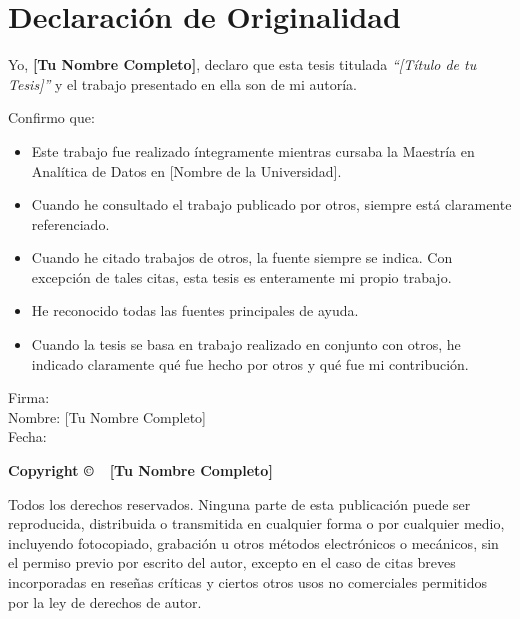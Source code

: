 
\chapter*{Declaración de Originalidad}
\thispagestyle{empty}

\vspace{2cm}

Yo, \textbf{[Tu Nombre Completo]}, declaro que esta tesis titulada \textit{``[Título de tu Tesis]''} y el trabajo presentado en ella son de mi autoría.

\vspace{1cm}

Confirmo que:

\begin{itemize}
    \item Este trabajo fue realizado íntegramente mientras cursaba la Maestría en Analítica de Datos en [Nombre de la Universidad].
    
    \item Cuando he consultado el trabajo publicado por otros, siempre está claramente referenciado.
    
    \item Cuando he citado trabajos de otros, la fuente siempre se indica. Con excepción de tales citas, esta tesis es enteramente mi propio trabajo.
    
    \item He reconocido todas las fuentes principales de ayuda.
    
    \item Cuando la tesis se basa en trabajo realizado en conjunto con otros, he indicado claramente qué fue hecho por otros y qué fue mi contribución.
\end{itemize}

\vspace{2cm}

\noindent
Firma: \underline{\hspace{6cm}} \\[0.5cm]
Nombre: [Tu Nombre Completo] \\[0.5cm]
Fecha: \underline{\hspace{4cm}}

\vfill

\begin{center}
\textbf{Copyright \copyright\ \the\year\ [Tu Nombre Completo]}

Todos los derechos reservados. Ninguna parte de esta publicación puede ser reproducida, distribuida o transmitida en cualquier forma o por cualquier medio, incluyendo fotocopiado, grabación u otros métodos electrónicos o mecánicos, sin el permiso previo por escrito del autor, excepto en el caso de citas breves incorporadas en reseñas críticas y ciertos otros usos no comerciales permitidos por la ley de derechos de autor.
\end{center}

\newpage
